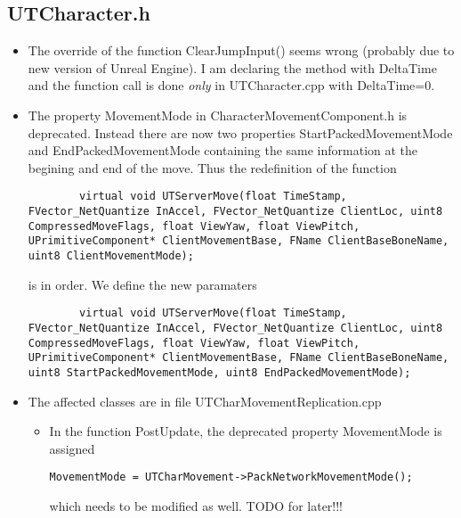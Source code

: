\documentclass{article}
\begin{document}
    \subsection{UTCharacter.h}
    \begin{itemize}
    \item The override of the function ClearJumpInput() seems wrong (probably due to new version of Unreal Engine).  I am declaring the method with DeltaTime and the function call is done \emph{only} in {\color{filecolor}UTCharacter.cpp} with DeltaTime=0.
    \item The property MovementMode in {\color{filecolor}CharacterMovementComponent.h} is deprecated.  Instead there are now two properties StartPackedMovementMode and EndPackedMovementMode containing the same information at the begining and end of the move.  Thus the redefinition of the function
      \lstset{language=c++}
      \begin{lstlisting}
        virtual void UTServerMove(float TimeStamp, FVector_NetQuantize InAccel, FVector_NetQuantize ClientLoc, uint8 CompressedMoveFlags, float ViewYaw, float ViewPitch, UPrimitiveComponent* ClientMovementBase, FName ClientBaseBoneName, uint8 ClientMovementMode);
      \end{lstlisting}
      is in order.  We define the new paramaters
\lstset{language=c++}
      \begin{lstlisting}
        virtual void UTServerMove(float TimeStamp, FVector_NetQuantize InAccel, FVector_NetQuantize ClientLoc, uint8 CompressedMoveFlags, float ViewYaw, float ViewPitch, UPrimitiveComponent* ClientMovementBase, FName ClientBaseBoneName, uint8 StartPackedMovementMode, uint8 EndPackedMovementMode);
      \end{lstlisting}
    \item The affected classes are in file {\color{filecolor}UTCharMovementReplication.cpp}
      \begin{itemize}
      \item In the function PostUpdate, the deprecated property MovementMode is assigned
\lstset{language=c++}
\begin{lstlisting}
MovementMode = UTCharMovement->PackNetworkMovementMode(); 
        \end{lstlisting}
        which needs to be modified as well.  TODO for later!!!
      \end{itemize}
    \end{itemize}
\end{document}
